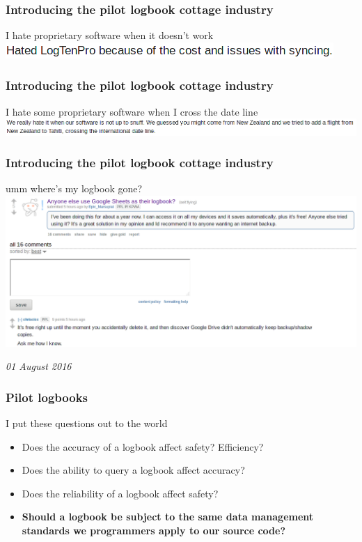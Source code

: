 \begin{frame}
\frametitle{Introducing the pilot logbook cottage industry}
\begin{block}{I hate proprietary software when it doesn't work}
\includegraphics[height=0.05\textheight]{image/logbook-5.png}
\end{block}
\end{frame}

\begin{frame}
\frametitle{Introducing the pilot logbook cottage industry}
\begin{block}{I hate some proprietary software when I cross the date line}
\includegraphics[height=0.05\textheight]{image/logbook-6.png}
\end{block}
\end{frame}

\begin{frame}
\frametitle{Introducing the pilot logbook cottage industry}
\begin{block}{umm where's my logbook gone?}
\includegraphics[height=0.4\textheight]{image/logbook-7.png}
\end{block}
\par
\tiny{\emph{01 August 2016}}
\end{frame}

\begin{frame}
\frametitle{Pilot logbooks}
\begin{block}{I put these questions out to the world}
\begin{itemize}
\item<1-> Does the accuracy of a logbook affect safety? Efficiency?
\item<2-> Does the ability to query a logbook affect accuracy?
\item<3-> Does the reliability of a logbook affect safety?
\item<4-> \textbf{Should a logbook be subject to the same data management standards we programmers apply to our source code?}
\end{itemize}

\end{block}
\end{frame}

